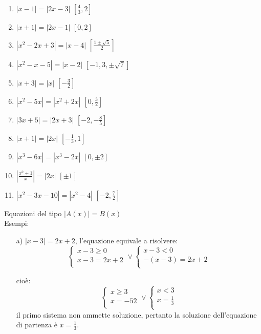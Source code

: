 \begin{enumerate}
\item $\left| x-1\right| =\left| 2x-3\right| $ \hfill $\left[ \frac{4}{3}, 
2\right] $
\item $\left| x+1\right| =\left| 2x-1\right| $ \hfill $\left[ 0, 2\right] $
\item $\left| x^2-2x+3 \right| =\left| x-4 \right| $ \hfill $\left[ 
\frac{1\pm\sqrt{5}}{2}\right] $
\item $\left| x^2-x-5\right| =\left| x-2\right| $ \hfill $\left[ -1, 3, \pm 
\sqrt{7}\right] $
\item $\left| x+3\right| =\left| x\right| $ \hfill $\left[ -\frac{3}{2} \right] 
$
\item $\left| x^2-5x \right| =\left| x^2+2x \right| $ \hfill $\left[ 0, 
\frac{3}{2} \right] $
\item $\left| 3x+5\right| =\left| 2x+3\right| $ \hfill $\left[-2, -\frac{8}{5} 
\right] $
\item $\left| x+1\right| =\left| 2x\right| $ \hfill $\left[ -\frac{1}{3}, 1 
\right] $
\item $\left| x^3-6x\right| =\left| x^3-2x\right| $ \hfill $\left[ 0, \pm 2 
\right] $
\item $\left|\frac{x^2+1}{x}\right| =\left| 2x\right| $ \hfill $\left[ \pm 1 
\right] $
\item $\left| x^2-3x-10\right| =\left| x^2-4\right| $ \hfill $\left[-2, 
\frac{7}{2} \right] $
\end{enumerate}

Equazioni del tipo $|A(x)|=B(x)$\\
Esempi:
\begin{enumerate}
        \item[a)] $|x-3|=2x+2$, l'equazione equivale a risolvere:
        $$
        \left\lbrace 
        \begin{array}{l}
        x-3\geq 0 \\
        x-3=2x+2\\
        \end{array}
        \right.
        \vee
        \left\lbrace 
        \begin{array}{l}
        x-3< 0 \\
        -(x-3)=2x+2\\
        \end{array}
        \right.
        $$      

        cioè:
        $$
        \left\lbrace 
        \begin{array}{l}
        x\geq 3 \\
        x=-52\\
        \end{array}
        \right.
        \vee
        \left\lbrace 
        \begin{array}{l}
        x< 3 \\
        x=\frac{1}{3}\\
        \end{array}
        \right.
        $$
il primo sistema non ammette soluzione, pertanto la soluzione dell'equazione di 
partenza è $    x=\frac{1}{3}$.
\end{enumerate}

